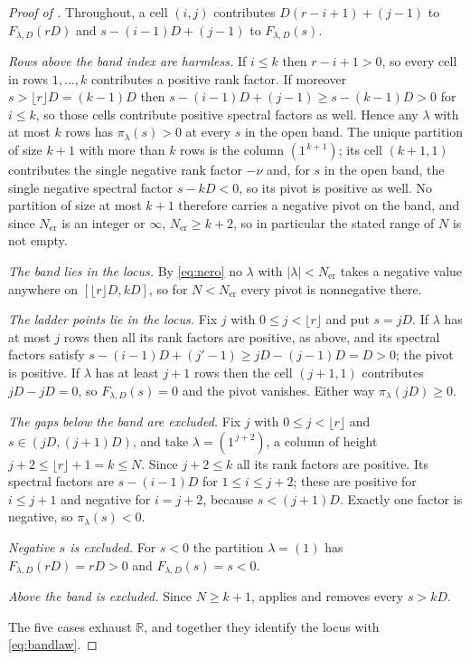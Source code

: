 \documentclass[11pt,letterpaper]{article}
\newcommand{\Rr}{\mathbb{R}}
\begin{document}
\begin{proof}[Proof of ]
Throughout, a cell $(i,j)$ contributes $D(r-i+1)+(j-1)$ to $F_{\lambda,D}(rD)$ and
$s-(i-1)D+(j-1)$ to $F_{\lambda,D}(s)$.

\emph{Rows above the band index are harmless.} If $i\le k$ then $r-i+1>0$, so
every cell in rows $1,\dots,k$ contributes a positive rank factor. If moreover
$s>\lfloor r\rfloor D=(k-1)D$ then $s-(i-1)D+(j-1)\ge s-(k-1)D>0$ for $i\le k$, so
those cells contribute positive spectral factors as well. Hence any $\lambda$ with
at most $k$ rows has $\pi_\lambda(s)>0$ at every $s$ in the open band. The unique
partition of size $k+1$ with more than $k$ rows
is the column $(1^{\,k+1})$; its cell $(k+1,1)$ contributes the single negative
rank factor $-\nu$ and, for $s$ in the open band, the single negative spectral
factor $s-kD<0$, so its pivot is positive as well. No partition of size at most
$k+1$ therefore carries a negative pivot on the band, and since
$N_{\mathrm{er}}$ is an integer or $\infty$, $N_{\mathrm{er}}\ge k+2$, so in
particular the stated range of $N$ is not empty.

\emph{The band lies in the locus.} By \eqref{eq:nero} no $\lambda$ with
$|\lambda|<N_{\mathrm{er}}$ takes a negative value anywhere on
$[\lfloor r\rfloor D,kD]$, so for $N<N_{\mathrm{er}}$ every pivot is nonnegative
there.

\emph{The ladder points lie in the locus.} Fix $j$ with $0\le j<\lfloor r\rfloor$
and put $s=jD$. If $\lambda$ has at most $j$ rows then all its rank factors are
positive, as above, and its spectral factors satisfy
$s-(i-1)D+(j'-1)\ge jD-(j-1)D=D>0$; the pivot is positive. If $\lambda$ has at
least $j+1$ rows then the cell $(j+1,1)$ contributes $jD-jD=0$, so
$F_{\lambda,D}(s)=0$ and the pivot vanishes. Either way $\pi_\lambda(jD)\ge0$.

\emph{The gaps below the band are excluded.} Fix $j$ with $0\le j<\lfloor r\rfloor$
and $s\in(jD,(j+1)D)$, and take $\lambda=(1^{\,j+2})$, a column of height $j+2\le
\lfloor r\rfloor+1=k\le N$. Since $j+2\le k$ all its rank factors are positive. Its
spectral factors are $s-(i-1)D$ for $1\le i\le j+2$; these are positive for
$i\le j+1$ and negative for $i=j+2$, because $s<(j+1)D$. Exactly one factor is
negative, so $\pi_\lambda(s)<0$.

\emph{Negative $s$ is excluded.} For $s<0$ the partition $\lambda=(1)$ has
$F_{\lambda,D}(rD)=rD>0$ and $F_{\lambda,D}(s)=s<0$.

\emph{Above the band is excluded.} Since $N\ge k+1$,  applies and
removes every $s>kD$.

The five cases exhaust $\Rr$, and together they identify the locus with
\eqref{eq:bandlaw}.
\end{proof}
\end{document}
